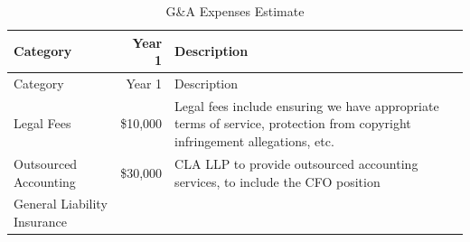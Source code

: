 \documentclass[10pt,openany]{book}
\begin{document}
\begin{longtable}[]{@{}lrl@{}}
\caption{G\&A Expenses Estimate}\tabularnewline
\toprule
\begin{minipage}[b]{0.31\columnwidth}\raggedright
Category\strut
\end{minipage} & \begin{minipage}[b]{0.12\columnwidth}\raggedleft
Year 1\strut
\end{minipage} & \begin{minipage}[b]{0.48\columnwidth}\raggedright
Description\strut
\end{minipage}\tabularnewline
\midrule
\endfirsthead
\toprule
\begin{minipage}[b]{0.31\columnwidth}\raggedright
Category\strut
\end{minipage} & \begin{minipage}[b]{0.12\columnwidth}\raggedleft
Year 1\strut
\end{minipage} & \begin{minipage}[b]{0.48\columnwidth}\raggedright
Description\strut
\end{minipage}\tabularnewline
\midrule
\endhead
\begin{minipage}[t]{0.31\columnwidth}\raggedright
Legal Fees\strut
\end{minipage} & \begin{minipage}[t]{0.12\columnwidth}\raggedleft
\$10,000\strut
\end{minipage} & \begin{minipage}[t]{0.48\columnwidth}\raggedright
Legal fees include ensuring we have appropriate terms of service,
protection from copyright infringement allegations, etc.\strut
\end{minipage}\tabularnewline
\begin{minipage}[t]{0.31\columnwidth}\raggedright
Outsourced Accounting\strut
\end{minipage} & \begin{minipage}[t]{0.12\columnwidth}\raggedleft
\$30,000\strut
\end{minipage} & \begin{minipage}[t]{0.48\columnwidth}\raggedright
CLA LLP to provide outsourced accounting services, to include the CFO
position\strut
\end{minipage}\tabularnewline
\begin{minipage}[t]{0.31\columnwidth}\raggedright
General Liability Insurance\strut
\end{minipage} & \begin{minipage}[t]{0.12\columnwidth}\raggedleft

\end{minipage}
\end{longtable}
\end{document}
